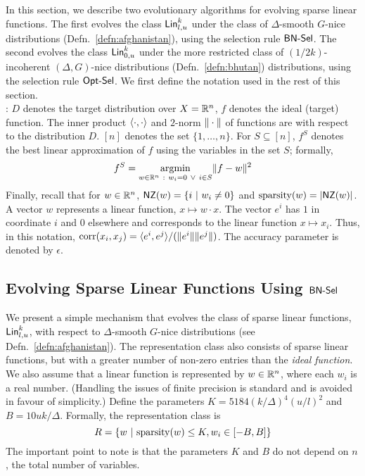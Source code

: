 In this section, we describe two evolutionary algorithms for evolving sparse
linear functions. The first evolves the class $\mathsf{Lin}^k_{l, u}$ under the class of
$\Delta$-smooth $G$-nice distributions (Defn.~\ref{defn:afghanistan}), using the
selection rule $\mathsf{BN\mbox{-}Sel}$. The second evolves the class $\mathsf{Lin}^k_{0, u}$ under the
more restricted class of $(1/2k)$-incoherent $(\Delta, G)$-nice distributions
(Defn.~\ref{defn:bhutan}) distributions, using the selection rule $\mathsf{Opt\mbox{-}Sel}$. We
first define the notation used in the rest of this section.\smallskip \\

: $D$ denotes the target distribution over $X =
\mathbb{R}^n$, $f$ denotes the ideal (target) function. The inner product
$\langle \cdot, \cdot \rangle$ and $2$-norm $\Vert \cdot \Vert$ of functions are with
respect to the distribution $D$. $[n]$ denotes the set $\{1, \ldots, n\}$. For
$S \subseteq [n]$, $f^S$ denotes the best linear approximation of $f$ using the
variables in the set $S$; formally,
\begin{align}
f^S = \underset{w \in \mathbb{R}^n~:~ w_i = 0 ~\vee~i \in S}{\mathrm{argmin}} \Vert f -
w \Vert^2 \label{eqn:artichoke}
\end{align}
Finally, recall that for $w \in \mathbb{R}^n$, $\mathsf{NZ}(w) = \{i ~|~ w_i \neq 0 \}$ and
$\mathrm{sparsity}(w) = |\mathsf{NZ}(w)|$. A vector $w$ represents a linear function, $x \mapsto
w \cdot x$. The vector $e^i$ has $1$ in coordinate $i$ and $0$ elsewhere and
corresponds to the linear function $x \mapsto x_i$. Thus, in this notation,
$\mathrm{corr}(x_i, x_j) = \langle e^i, e^j \rangle/(\Vert e^i \Vert\Vert e^j \Vert)$. The accuracy
parameter is denoted by $\epsilon$. 

\subsection{Evolving Sparse Linear Functions Using $\mathsf{BN\mbox{-}Sel}$}
\label{sec:sparse_linear}

We present a simple mechanism that evolves the class of sparse linear functions,
$\mathsf{Lin}^k_{l, u}$, with respect to $\Delta$-smooth $G$-nice distributions (see
Defn.~\ref{defn:afghanistan}). The representation class also consists of
sparse linear functions, but with a greater number of non-zero entries than the
\emph{ideal function}. We also assume that a linear function is represented by
$w \in \mathbb{R}^n$, where each $w_i$ is a real number. (Handling the issues of
finite precision is standard and is avoided in favour of simplicity.) Define the
parameters $K = 5184(k/\Delta)^4(u/l)^2$ and $B = 10 uk /\Delta$. Formally, the
representation class is
\[ 
R = \{ w ~|~ \mathrm{sparsity}(w) \leq K, w_i \in [-B, B] \}
\]
The important point to note is that the parameters $K$ and $B$ do not depend on
$n$, the total number of variables.

